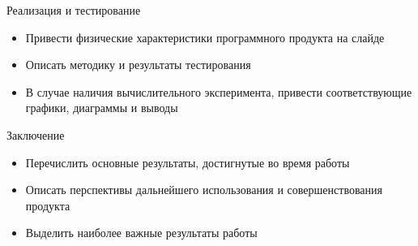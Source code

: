 \documentclass{fefu_presentation}
\begin{document}
    \begin{frame}{Реализация и тестирование}
        \begin{block}{}
            \begin{itemize}
                \item Привести физические характеристики программного продукта на слайде
                \item Описать методику и результаты тестирования
                \item В случае наличия вычислительного эксперимента, привести соответствующие графики, диаграммы и выводы
            \end{itemize}
        \end{block}
    \end{frame}


    \begin{frame}{Заключение}
        \begin{block}{}
            \begin{itemize}
                \item Перечислить основные результаты, достигнутые во время работы
                \item Описать перспективы дальнейшего использования и совершенствования продукта
                \item Выделить наиболее важные результаты работы
            \end{itemize}
        \end{block}
    \end{frame}

    
\end{document}
